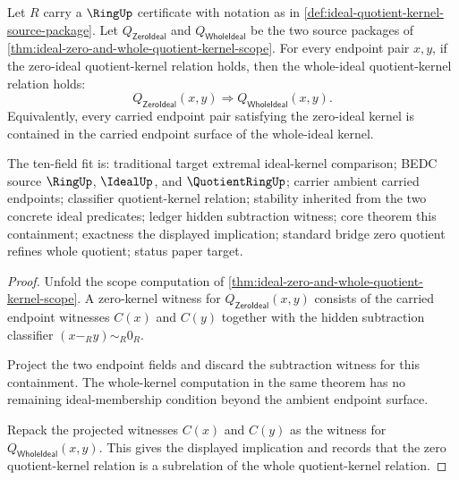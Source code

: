 \begin{theorem}
\label{thm:ideal-zero-kernel-contained-in-whole-kernel}
Let $R$ carry a $\RingUp$ certificate with notation as in \autoref{def:ideal-quotient-kernel-source-package}. Let $Q_{\mathsf{ZeroIdeal}}$ and $Q_{\mathsf{WholeIdeal}}$ be the two source packages of \autoref{thm:ideal-zero-and-whole-quotient-kernel-scope}. For every endpoint pair $x,y$, if the zero-ideal quotient-kernel relation holds, then the whole-ideal quotient-kernel relation holds:
$$
Q_{\mathsf{ZeroIdeal}}(x,y)\Longrightarrow Q_{\mathsf{WholeIdeal}}(x,y).
$$
Equivalently, every carried endpoint pair satisfying the zero-ideal kernel is contained in the carried endpoint surface of the whole-ideal kernel.

The ten-field fit is: traditional target extremal ideal-kernel comparison; BEDC source $\RingUp$, $\IdealUp$, and $\QuotientRingUp$; carrier ambient carried endpoints; classifier quotient-kernel relation; stability inherited from the two concrete ideal predicates; ledger hidden subtraction witness; core theorem this containment; exactness the displayed implication; standard bridge zero quotient refines whole quotient; status paper target.
\end{theorem}
\begin{proof}
Unfold the scope computation of \autoref{thm:ideal-zero-and-whole-quotient-kernel-scope}. A zero-kernel witness for $Q_{\mathsf{ZeroIdeal}}(x,y)$ consists of the carried endpoint witnesses $C(x)$ and $C(y)$ together with the hidden subtraction classifier $(x-_R y)\sim_R0_R$.

Project the two endpoint fields and discard the subtraction witness for this containment. The whole-kernel computation in the same theorem has no remaining ideal-membership condition beyond the ambient endpoint surface.

Repack the projected witnesses $C(x)$ and $C(y)$ as the witness for $Q_{\mathsf{WholeIdeal}}(x,y)$. This gives the displayed implication and records that the zero quotient-kernel relation is a subrelation of the whole quotient-kernel relation.
\end{proof}
